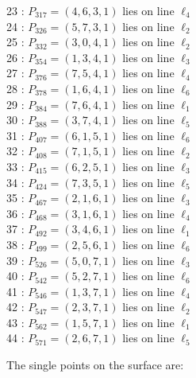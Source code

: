 \documentclass{article}
\begin{document}
{\begin{multicols}{2}
23 : $P_{317}=( 4, 6, 3, 1 )$ lies on line $\ell_{4}$\\
24 : $P_{326}=( 5, 7, 3, 1 )$ lies on line $\ell_{2}$\\
25 : $P_{332}=( 3, 0, 4, 1 )$ lies on line $\ell_{2}$\\
26 : $P_{354}=( 1, 3, 4, 1 )$ lies on line $\ell_{3}$\\
27 : $P_{376}=( 7, 5, 4, 1 )$ lies on line $\ell_{4}$\\
28 : $P_{378}=( 1, 6, 4, 1 )$ lies on line $\ell_{6}$\\
29 : $P_{384}=( 7, 6, 4, 1 )$ lies on line $\ell_{1}$\\
30 : $P_{388}=( 3, 7, 4, 1 )$ lies on line $\ell_{5}$\\
31 : $P_{407}=( 6, 1, 5, 1 )$ lies on line $\ell_{6}$\\
32 : $P_{408}=( 7, 1, 5, 1 )$ lies on line $\ell_{2}$\\
33 : $P_{415}=( 6, 2, 5, 1 )$ lies on line $\ell_{3}$\\
34 : $P_{424}=( 7, 3, 5, 1 )$ lies on line $\ell_{5}$\\
35 : $P_{467}=( 2, 1, 6, 1 )$ lies on line $\ell_{3}$\\
36 : $P_{468}=( 3, 1, 6, 1 )$ lies on line $\ell_{4}$\\
37 : $P_{492}=( 3, 4, 6, 1 )$ lies on line $\ell_{1}$\\
38 : $P_{499}=( 2, 5, 6, 1 )$ lies on line $\ell_{6}$\\
39 : $P_{526}=( 5, 0, 7, 1 )$ lies on line $\ell_{3}$\\
40 : $P_{542}=( 5, 2, 7, 1 )$ lies on line $\ell_{6}$\\
41 : $P_{546}=( 1, 3, 7, 1 )$ lies on line $\ell_{4}$\\
42 : $P_{547}=( 2, 3, 7, 1 )$ lies on line $\ell_{2}$\\
43 : $P_{562}=( 1, 5, 7, 1 )$ lies on line $\ell_{1}$\\
44 : $P_{571}=( 2, 6, 7, 1 )$ lies on line $\ell_{5}$\\
\end{multicols}
The single points on the surface are:\\
}
\end{document}

